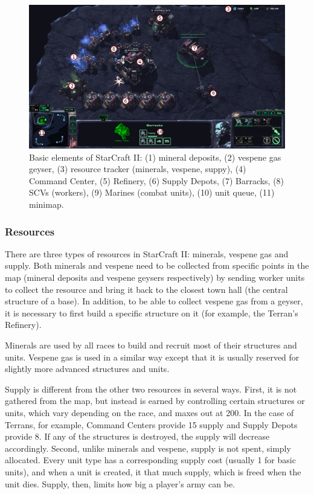 \begin{figure}[h]
    \centering
    \includegraphics[width=1\textwidth]{figs/SC2_basic_elements.png}
    \caption[Basic elements of StarCraft II]{Basic elements of StarCraft II: (1) mineral deposits, (2) vespene gas geyser, (3) resource tracker (minerals, vespene, suppy), (4) Command Center, (5) Refinery, (6) Supply Depots, (7) Barracks, (8) SCVs (workers), (9) Marines (combat units), (10) unit queue, (11) minimap.}
    \label{fig:sc2_screenshot}
\end{figure}

\subsubsection{Resources}

There are three types of resources in StarCraft II: minerals, vespene gas and supply. Both minerals and vespene need to be collected from specific points in the map (mineral deposits and vespene geysers respectively) by sending worker units to collect the resource and bring it back to the closest town hall (the central structure of a base). In addition, to be able to collect vespene gas from a geyser, it is necessary to first build a specific structure on it (for example, the Terran's Refinery).

Minerals are used by all races to build and recruit most of their structures and units. Vespene gas is used in a similar way except that it is usually reserved for slightly more advanced structures and units.

Supply is different from the other two resources in several ways. First, it is not gathered from the map, but instead is earned by controlling certain structures or units, which vary depending on the race, and maxes out at 200. In the case of Terrans, for example, Command Centers provide 15 supply and Supply Depots provide 8. If any of the structures is destroyed, the supply will decrease accordingly. Second, unlike minerals and vespene, supply is not spent, simply allocated. Every unit type has a corresponding supply cost (usually 1 for basic units), and when a unit is created, it  that much supply, which is freed when the unit dies. Supply, then, limits how big a player's army can be.

